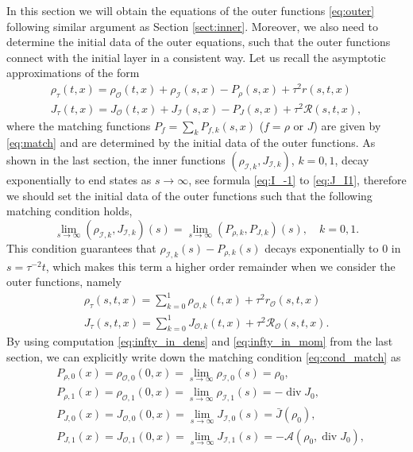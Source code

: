 \documentclass[english]{amsart}
\theoremstyle{plain}
\theoremstyle{definition}
\theoremstyle{remark}
\theoremstyle{plain}
\theoremstyle{plain}
\theoremstyle{plain}
\DeclareMathOperator{\diver}{div}
\numberwithin{equation}{section}
\begin{document}
In this section we will obtain the equations of the outer functions \eqref{eq:outer} following similar argument as Section \ref{sect:inner}. Moreover, we also need to determine the initial data of the outer equations, such that the outer functions connect with the initial layer in a consistent way. Let us recall the asymptotic approximations of the form
\begin{align*}
\rho_\tau(t,x)=\rho_\mathcal{O}(t,x)+\rho_\mathcal{I}(s,x)-P_\rho(s,x)+\tau^2 r(s,t,x)\\
J_\tau(t,x)= J_\mathcal{O}(t,x)+J_\mathcal{I}(s,x)-P_J(s,x)+\tau^2\mathcal{R}(s,t,x),
\end{align*}
where the matching functions $P_f=\sum_kP_{f,k}(s,x)$ ($f=\rho$ or $J$) are given by \eqref{eq:match} and are determined by the initial data of the outer functions. As shown in the last section, the inner functions $(\rho_{\mathcal{I},k},J_{\mathcal{I},k})$, $k=0,1$, decay exponentially to end states as $s\to\infty$, see formula \eqref{eq:I_-1} to \eqref{eq:J_I1}, therefore we should set the initial data of the outer functions such that the following matching condition holds,
\begin{equation}\label{eq:cond_match}
\lim_{s\to\infty}(\rho_{\mathcal{I},k},J_{\mathcal{I},k})(s)=\lim_{s\to\infty}(P_{\rho,k},P_{J,k})(s),\quad k=0,1.
\end{equation}
This condition guarantees that $\rho_{\mathcal{I},k}(s)-P_{\rho,k}(s)$ decays exponentially to $0$ in $s=\tau^{-2}t$, which makes this term a higher order remainder when we consider the outer functions, namely
\begin{align*}
\rho_\tau(s,t,x)=\sum_{k=0}^1\rho_{\mathcal{O},k}\left(t,x\right)+\tau^2 r_\mathcal{O}(s,t,x)\\
J_\tau(s,t,x)= \sum_{k=0}^1 J_{\mathcal{O},k}\left(t,x\right)+\tau^2\mathcal{R}_\mathcal{O}(s,t,x).
\end{align*}
By using computation \eqref{eq:infty_in_dens} and \eqref{eq:infty_in_mom} from the last section, we can explicitly write down the matching condition \eqref{eq:cond_match} as
\begin{equation}\label{eq:ini_outer}
\begin{aligned}
&P_{\rho,0}(x)=\rho_{\mathcal{O},0}(0,x)=\lim_{s\to\infty}\rho_{\mathcal{I},0}(s)=\rho_0,\\
&P_{\rho,1}(x)=\rho_{\mathcal{O},1}(0,x)=\lim_{s\to\infty}\rho_{\mathcal{I},1}(s)=-\diver J_0,\\
&P_{J,0}(x)=J_{\mathcal{O},0}(0,x)=\lim_{s\to\infty}J_{\mathcal{I},0}(s)=\bar{J}(\rho_0),\\
&P_{J,1}(x)=J_{\mathcal{O},1}(0,x)=\lim_{s\to\infty}J_{\mathcal{I},1}(s)=-\mathcal{A}(\rho_0,\diver J_0),
\end{aligned}
\end{equation}
\end{document}
